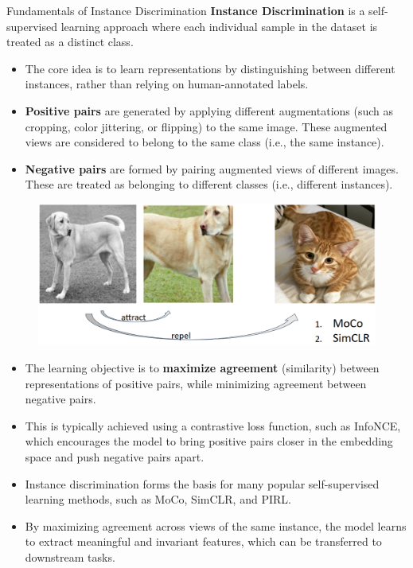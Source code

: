 \begin{frame}[allowframebreaks]{Fundamentals of Instance Discrimination}
    \textbf{Instance Discrimination} is a self-supervised learning approach where each individual sample in the dataset is treated as a distinct class.
    \begin{itemize}
        \item The core idea is to learn representations by distinguishing between different instances, rather than relying on human-annotated labels.
        \item \textbf{Positive pairs} are generated by applying different augmentations (such as cropping, color jittering, or flipping) to the same image. These augmented views are considered to belong to the same class (i.e., the same instance).
        \item \textbf{Negative pairs} are formed by pairing augmented views of different images. These are treated as belonging to different classes (i.e., different instances).
    \end{itemize}

    \framebreak
    \begin{figure}
        \centering
        \includegraphics[width=1\linewidth,height=0.9\textheight,keepaspectratio]{images/ssl/slide_63_img.png}
    \end{figure}

    \framebreak
    \begin{itemize}
        \item The learning objective is to \textbf{maximize agreement} (similarity) between representations of positive pairs, while minimizing agreement between negative pairs.
        \item This is typically achieved using a contrastive loss function, such as InfoNCE, which encourages the model to bring positive pairs closer in the embedding space and push negative pairs apart.
        \item Instance discrimination forms the basis for many popular self-supervised learning methods, such as MoCo, SimCLR, and PIRL.
        \item By maximizing agreement across views of the same instance, the model learns to extract meaningful and invariant features, which can be transferred to downstream tasks.
    \end{itemize}
\end{frame}